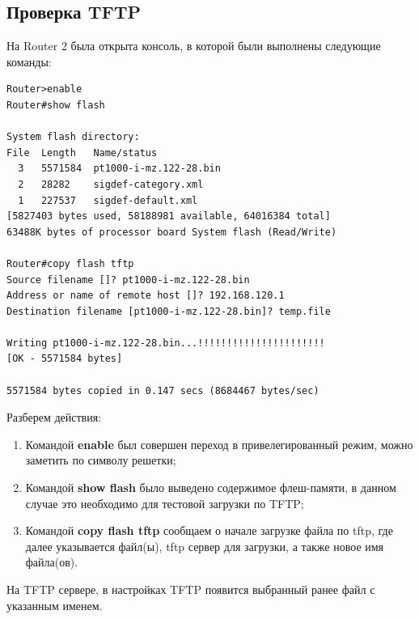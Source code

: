 \documentclass[14pt,a4paper,report]{report}
\begin{document}
\subsection{Проверка TFTP}
На Router 2 была открыта консоль, в которой были выполнены следующие команды:
\begin{lstlisting}[language={}]
Router>enable
Router#show flash

System flash directory:
File  Length   Name/status
  3   5571584  pt1000-i-mz.122-28.bin
  2   28282    sigdef-category.xml
  1   227537   sigdef-default.xml
[5827403 bytes used, 58188981 available, 64016384 total]
63488K bytes of processor board System flash (Read/Write)

Router#copy flash tftp
Source filename []? pt1000-i-mz.122-28.bin
Address or name of remote host []? 192.168.120.1
Destination filename [pt1000-i-mz.122-28.bin]? temp.file

Writing pt1000-i-mz.122-28.bin...!!!!!!!!!!!!!!!!!!!!!!
[OK - 5571584 bytes]

5571584 bytes copied in 0.147 secs (8684467 bytes/sec)
\end{lstlisting}
Разберем действия:
\begin{enumerate}
\item Командой \textbf{enable} был совершен переход в привелегированный режим, можно заметить по символу решетки;
\item Командой \textbf{show flash} было выведено содержимое флеш-памяти, в данном случае это необходимо для тестовой загрузки по TFTP;
\item Командой \textbf{copy flash tftp} сообщаем о начале загрузке файла по tftp, где далее указывается файл(ы), tftp сервер для загрузки, а также новое имя файла(ов). 
\end{enumerate}
На TFTP сервере, в настройках TFTP появится выбранный ранее файл с указанным именем.



\end{document}
